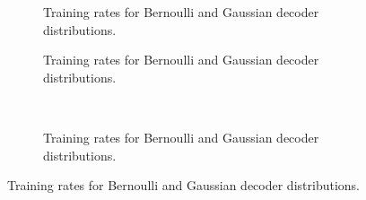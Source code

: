 \documentclass{article} %
\begin{document}
\begin{figure}
\captionsetup[subfigure]{justification=centering}
    \centering
     \begin{subfigure}[b]{0.45\textwidth}
    \resizebox{\linewidth}{!}{}
    \caption{Training rates for Bernoulli and Gaussian decoder distributions.}
    \label{fig:bergau}
    \end{subfigure}
    \hfill
    \begin{subfigure}[b]{0.45\textwidth}
    \resizebox{\linewidth}{!}{}
    \caption{Training rates for Bernoulli and Gaussian decoder distributions.}
    \label{fig:bergau}
    \end{subfigure}\\
    \begin{subfigure}[b]{0.45\textwidth}
    \resizebox{\linewidth}{!}{}
    \caption{Training rates for Bernoulli and Gaussian decoder distributions.}
    \label{fig:bergau}
    \end{subfigure}
    

%    
\end{figure}
\end{document}
